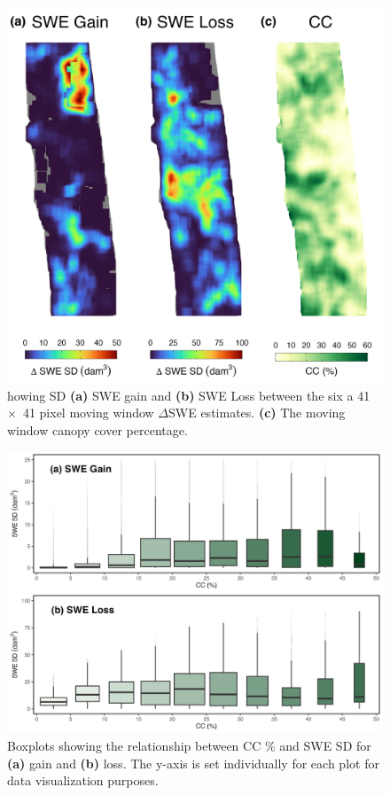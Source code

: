 \clearpage
\begin{figure}[t]
\centering
\includegraphics[width=\textwidth]{figures/ch4_figs/sd_vs_cc_map_dam3_41x41_v2.png}
\caption{howing SD \textbf{(a)} SWE gain and \textbf{(b)} SWE Loss between the six a 41~$\times$~41 pixel moving window $\Delta$SWE estimates. \textbf{(c)} The moving window canopy cover percentage.}
\label{fig:dswe_standard_deviation}
\end{figure}

\clearpage
\begin{figure}[t]
\centering
\includegraphics[width=\textwidth]{figures/ch4_figs/swe_sd_bp_dam3_41x41_v1.png}
\caption{Boxplots showing the relationship between CC \% and SWE SD for \textbf{(a)} gain and \textbf{(b)} loss. The y-axis is set individually for each plot for data visualization purposes.}
\label{fig:dswe_boxplots}
\end{figure}

